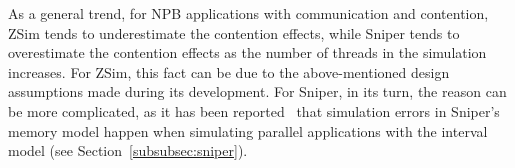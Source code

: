 \documentclass[AMA,final,STIX1COL]{WileyNJD-v2}
\begin{document}
As a general trend, for NPB applications with communication and contention, ZSim tends to underestimate the contention effects, while Sniper tends to overestimate the contention effects as the number of threads in the simulation increases.
For ZSim, this fact can be due to the above-mentioned design assumptions made during its development. 
For Sniper, in its turn, the reason can be more complicated, as it has been reported~\cite{carlson2014aeohmcm} that simulation errors in Sniper's memory model happen when simulating parallel applications with the interval model (see Section~\ref{subsubsec:sniper}). 









\end{document}
